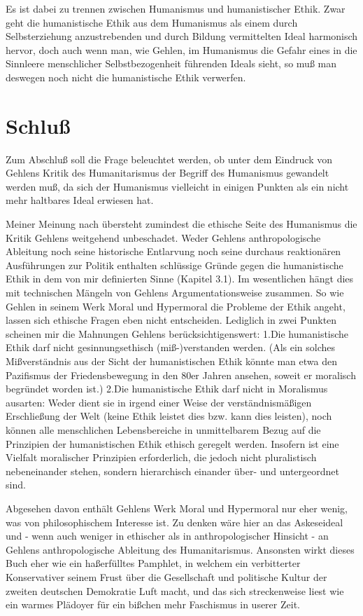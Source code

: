\documentclass[12pt,a4paper]{article}
\begin{document}
Es ist dabei zu trennen zwischen Humanismus und humanistischer Ethik. Zwar
geht die humanistische Ethik aus dem Humanismus als einem durch
Selbsterziehung anzustrebenden und durch Bildung vermittelten Ideal
harmonisch hervor, doch auch wenn man, wie Gehlen, im Humanismus die Gefahr
eines in die Sinnleere menschlicher Selbstbezogenheit führenden Ideals
sieht, so muß man deswegen noch nicht die humanistische Ethik verwerfen.

\section{Schluß}

Zum Abschluß soll die Frage beleuchtet werden, ob unter dem Eindruck
von Gehlens Kritik des Humanitarismus der Begriff des Humanismus
gewandelt werden muß, da sich der Humanismus vielleicht in einigen
Punkten als ein nicht mehr haltbares Ideal erwiesen hat.

Meiner Meinung nach übersteht zumindest die ethische Seite des
Humanismus die Kritik Gehlens weitgehend unbeschadet. Weder Gehlens
anthropologische Ableitung noch seine historische Entlarvung noch
seine durchaus reaktionären Ausführungen zur Politik enthalten
schlüssige Gründe gegen die humanistische Ethik in dem von mir
definierten Sinne (Kapitel 3.1). Im wesentlichen hängt dies mit
technischen Mängeln von Gehlens Argumentationsweise zusammen. So wie
Gehlen in seinem Werk Moral und Hypermoral die Probleme der Ethik
angeht, lassen sich ethische Fragen eben nicht entscheiden. Lediglich
in zwei Punkten scheinen mir die Mahnungen Gehlens
berücksichtigenswert: 1.Die humanistische Ethik darf nicht
gesinnungsethisch (miß-)verstanden werden. (Als ein solches
Mißverständnis aus der Sicht der humanistischen Ethik könnte man etwa
den Pazifismus der Friedensbewegung in den 80er Jahren ansehen, soweit
er moralisch begründet worden ist.) 2.Die humanistische Ethik darf nicht in
Moralismus ausarten: Weder dient sie in irgend einer Weise der
verständnismäßigen Erschließung der Welt (keine Ethik leistet dies
bzw. kann dies leisten), noch können alle menschlichen Lebensbereiche
in unmittelbarem Bezug auf die Prinzipien der humanistischen Ethik
ethisch geregelt werden. Insofern ist eine Vielfalt moralischer
Prinzipien erforderlich, die jedoch nicht pluralistisch nebeneinander
stehen, sondern hierarchisch einander über- und untergeordnet sind.

Abgesehen davon enthält Gehlens Werk Moral und Hypermoral nur eher
wenig, was von philosophischem Interesse ist. Zu denken wäre hier an
das Askeseideal und - wenn auch weniger in ethischer als in
anthropologischer Hinsicht - an Gehlens anthropologische Ableitung des
Humanitarismus. Ansonsten wirkt dieses Buch eher wie ein haßerfülltes
Pamphlet, in welchem ein verbitterter Konservativer seinem Frust über
die Gesellschaft und politische Kultur der zweiten deutschen
Demokratie Luft macht, und das sich streckenweise liest wie ein warmes
Plädoyer für ein bißchen mehr Faschismus in userer Zeit.
\end{document}
